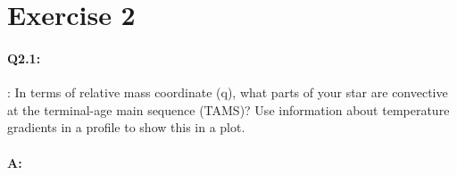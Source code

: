 \documentclass[twocolumn,fontsize=11pt]{scrartcl}
\begin{document}
\section{Exercise 2}

\paragraph{Q2.1:} : In terms of relative mass coordinate (q), what parts of your star are convective at the
terminal-age main sequence (TAMS)? Use information about temperature gradients in
a profile to show this in a plot.

\paragraph{A:} 

\printbibliography
\end{document}
